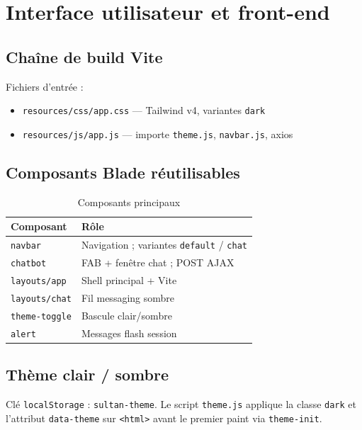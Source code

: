 \chapter{Interface utilisateur et front-end}
\label{ch:frontend}

\section{Chaîne de build Vite}

Fichiers d'entrée :
\begin{itemize}
  \item \texttt{resources/css/app.css} — Tailwind v4, variantes \texttt{dark}
  \item \texttt{resources/js/app.js} — importe \texttt{theme.js}, \texttt{navbar.js}, axios
\end{itemize}

\section{Composants Blade réutilisables}

\begin{table}[H]
\centering
\caption{Composants principaux}
\begin{tabular}{@{}lp{8.5cm}@{}}
\toprule
\textbf{Composant} & \textbf{Rôle} \\
\midrule
\texttt{navbar} & Navigation ; variantes \texttt{default} / \texttt{chat} \\
\texttt{chatbot} & FAB + fenêtre chat ; POST AJAX \\
\texttt{layouts/app} & Shell principal + Vite \\
\texttt{layouts/chat} & Fil messaging sombre \\
\texttt{theme-toggle} & Bascule clair/sombre \\
\texttt{alert} & Messages flash session \\
\bottomrule
\end{tabular}
\end{table}

\section{Thème clair / sombre}

Clé \texttt{localStorage} : \texttt{sultan-theme}. Le script \texttt{theme.js} applique la classe \texttt{dark} et l'attribut \texttt{data-theme} sur \texttt{<html>} avant le premier paint via \texttt{theme-init}.

